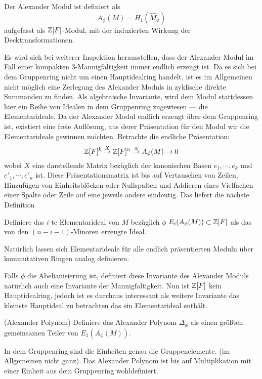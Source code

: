     	\begin{defn}
    		Der Alexander Modul ist definiert als
    		\[
    			A_\phi(M) = H_1(\hat M_\phi)
    		\]
    		aufgefasst als $\mathbb{Z}[F]$-Modul, mit der induzierten Wirkung der Decktransformationen.
    	\end{defn}
    	Es wird sich bei weiterer Inspektion herausstellen, dass der Alexander Modul im Fall einer kompakten 3-Mannigfaltigkeit immer endlich erzeugt ist. 
    	Da es sich bei dem Gruppenring nicht um einen Hauptidealring handelt, ist es im Allgemeinen nicht möglich eine Zerlegung des Alexander Moduls in zyklische direkte Summanden zu finden. Als algebraische Invariante, wird dem Modul stattdessen hier ein Reihe von Idealen in dem Gruppenring zugewiesen --- die Elementarideale. Da der Alexander Modul endlich erzeugt über dem Gruppenring ist, existiert eine freie Auflösung, aus derer Präsentation für den Modul wir die Elementarideale gewinnen möchten. Betrachte die endliche Präsentation:
    	\[
    		\mathbb{Z}[F]^k \stackrel{X}{\to} \mathbb{Z}[F]^n \stackrel{\alpha}{\to} A_\phi(M) \to 0
    	\]
    	wobei $X$ eine darstellende Matrix bezüglich der kanonischen Basen $e_1, \cdots , e_k$ und $e'_1, \cdots ,e'_n$ ist. Diese Präsentationsmatrix ist bis auf Vertauschen von Zeilen, Hinzufügen von Einheitsblöcken oder Nullspalten und Addieren eines Vielfachen einer Spalte oder Zeile auf eine jeweils andere eindeutig. Das liefert die nächste Definition
    	\begin{defn}
    		Definiere das $i$-te Elementarideal von $M$ bezüglich $\phi$ $E_i(A_\phi(M)) \subset \mathbb{Z} [F]$ als das von den $(n-i-1)$-Minoren erzeugte Ideal.  
    	\end{defn}

    	Natürlich lassen sich Elementarideale für alle endlich präsentierten Moduln über kommutativen Ringen analog definieren.

    	Falls $\phi$ die Abelianisierung ist, definiert diese Invariante des Alexander Moduls natürlich auch eine Invariante der Mannigfaltigkeit. Nun ist $\mathbb{Z}[F]$ kein Hauptidealring, jedoch ist es durchaus interessant als weitere Invariante das kleinste Hauptideal zu betrachten das ein Elementarideal enthält.
    	\begin{defn}(Alexander Polynom)
    		Definiere das Alexander Polynom $\Delta_\phi$ als einen größten gemeinsamen Teiler von $E_1(A_\phi(M))$.
    	\end{defn}
    	\begin{bem}
    		In dem Gruppenring sind die Einheiten genau die Gruppenelemente. (im Allgemeinen nicht ganz). Das Alexander Polynom ist bis auf Multiplikation mit einer Einheit aus dem Gruppenring wohldefiniert.
    	\end{bem}

